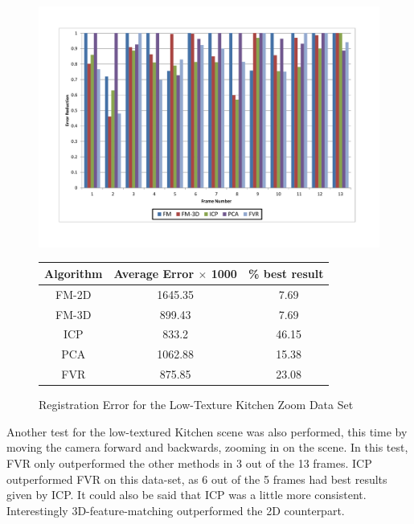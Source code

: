 \begin{figure}
\centering
\includegraphics[width=6in]{images/results/Kitchen_Little_Texture_Zoom}
\caption{Registration Error for the Low-Texture Kitchen Zoom Data Set}
\label{fig:PET7}

\begin{tabular}{ccc}
\hline
\textbf{Algorithm} & \textbf{Average Error $\times$ 1000} & \textbf{\% best result}\\ \hline
FM-2D	& 1645.35 & ~7.69\\
FM-3D	& 899.43 & ~7.69\\
ICP		& 833.2 & ~46.15\\
PCA		& 1062.88 & ~15.38\\
FVR		& 875.85 & ~23.08\\
\end{tabular}
\label{tab:PET7ST}
\end{figure} 



Another test for the low-textured Kitchen scene was also performed, this time by moving the camera forward and backwards, zooming in on the scene. In this test, FVR only outperformed the other methods in 3 out of the 13 frames. ICP outperformed FVR on this data-set, as 6 out of the 5 frames had best results given by ICP. It could also be said that ICP was a little more consistent. Interestingly 3D-feature-matching outperformed the 2D counterpart. \\


